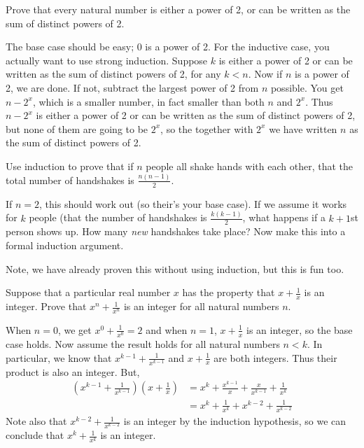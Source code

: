 \begin{questions}
	
\question Prove that every natural number is either a power of 2, or can be written as the sum of distinct powers of 2.

	\begin{answer}
		The base case should be easy; 0 is a power of 2.  For the inductive case, you actually want to use strong induction.  Suppose $k$ is either a power of 2 or can be written as the sum of distinct powers of 2, for any $k < n$.  Now if $n$ is a power of 2, we are done.  If not, subtract the largest power of 2 from $n$ possible.  You get $n - 2^x$, which is a smaller number, in fact smaller than both $n$ and $2^x$.  Thus $n-2^x$ is either a power of 2 or can be written as the sum of distinct powers of 2, but none of them are going to be $2^x$, so the together with $2^x$ we have written $n$ as the sum of distinct powers of 2.
	\end{answer}	

\question  Use induction to prove that if $n$ people all shake hands with each other, that the total number of handshakes is $\frac{n(n-1)}{2}$. 

	\begin{answer}
	  If $n = 2$, this should work out (so their's your base case).  If we assume it works for $k$ people (that the number of handshakes is $\frac{k(k-1)}{2}$, what happens if a $k+1$st person shows up.  How many {\em new} handshakes take place?  Now make this into a formal induction argument.
	  
	  Note, we have already proven this without using induction, but this is fun too.
	\end{answer}



\question Suppose that a particular real number $x$ has the property that $x + \frac{1}{x}$ is an integer.  Prove that $x^n + \frac{1}{x^n}$ is an integer for all natural numbers $n$.

	\begin{answer}
		When $n = 0$, we get $x^0 +\frac{1}{x^0} = 2$ and when $n = 1$, $x + \frac{1}{x}$ is an integer, so the base case holds.  Now assume the result holds for all natural numbers $n < k$.  In particular, we know that $x^{k-1} + \frac{1}{x^{k-1}}$ and $x + \frac{1}{x}$ are both integers.  Thus their product is also an integer.  But,
		\begin{align*}
		\left(x^{k-1} + \frac{1}{x^{k-1}}\right)\left(x + \frac{1}{x}\right) & = x^k + \frac{x^{k-1}}{x} + \frac{x}{x^{k-1}} + \frac{1}{x^k}\\
		& = x^k + \frac{1}{x^k} + x^{k-2} + \frac{1}{x^{k-2}}
		\end{align*}
		Note also that $x^{k-2} + \frac{1}{x^{k-2}}$ is an integer by the induction hypothesis, so we can conclude that $x^k + \frac{1}{x^k}$ is an integer.
		


\end{answer}
\end{questions}
